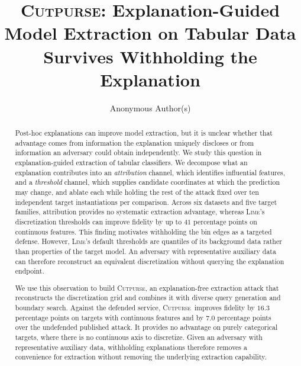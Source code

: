 \documentclass[sigconf,anonymous,review]{acmart}
\newcommand{\sys}{\textsc{Cutpurse}}
\begin{document}
\title[\sys]{\sys: Explanation-Guided Model Extraction on Tabular Data
Survives Withholding the Explanation}

\author{Anonymous Author(s)}
\email{}
\renewcommand{\shortauthors}{Anonymous}

\begin{abstract}
Post-hoc explanations can improve model extraction, but it is unclear whether that advantage comes from information the explanation uniquely discloses or from information an adversary could obtain independently. We study this question in explanation-guided extraction of tabular classifiers. We decompose what an explanation contributes into an \emph{attribution} channel, which identifies influential features, and a \emph{threshold} channel, which supplies candidate coordinates at which the prediction may change, and ablate each while holding the rest of the attack fixed over ten independent target instantiations per comparison. Across six datasets and five target families, attribution provides no systematic extraction advantage, whereas \textsc{Lime}'s discretization thresholds can improve fidelity by up to $41$ percentage points on continuous features. This finding motivates withholding the bin edges as a targeted defense. However, \textsc{Lime}'s default thresholds are quantiles of its background data rather than properties of the target model. An adversary with representative auxiliary data can therefore reconstruct an equivalent discretization without querying the explanation endpoint.

We use this observation to build \sys, an explanation-free extraction attack that reconstructs the discretization grid and combines it with diverse query generation and boundary search. Against the defended service, \sys\ improves fidelity by $16.3$ percentage points on targets with continuous features and by $7.0$ percentage points over the undefended published attack. It provides no advantage on purely categorical targets, where there is no continuous axis to discretize. Given an adversary with representative auxiliary data, withholding explanations therefore removes a convenience for extraction without removing the underlying extraction capability.
\end{abstract}

\end{document}
